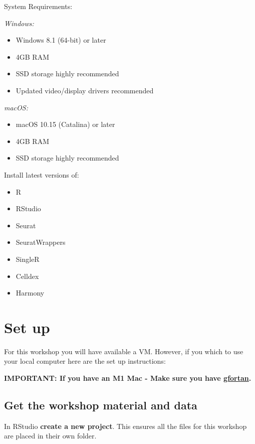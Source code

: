 \documentclass[
]{book}
\providecommand{\tightlist}{%
  \setlength{\itemsep}{0pt}\setlength{\parskip}{0pt}}
\begin{document}
System Requirements:

\emph{Windows:}

\begin{itemize}
\tightlist
\item
  Windows 8.1 (64-bit) or later
\item
  4GB RAM
\item
  SSD storage highly recommended
\item
  Updated video/display drivers recommended
\end{itemize}

\emph{macOS:}

\begin{itemize}
\tightlist
\item
  macOS 10.15 (Catalina) or later
\item
  4GB RAM
\item
  SSD storage highly recommended
\end{itemize}

Install latest versions of:

\begin{itemize}
\tightlist
\item
  R
\item
  RStudio
\item
  Seurat
\item
  SeuratWrappers
\item
  SingleR
\item
  Celldex
\item
  Harmony
\end{itemize}

\chapter{Set up}\label{set-up}

For this workshop you will have available a VM. However, if you which to use your local computer here are the set up instructions:

\textbf{IMPORTANT: If you have an M1 Mac - Make sure you have \href{https://mac.r-project.org/tools/}{gfortan}.}

\section{Get the workshop material and data}\label{get-the-workshop-material-and-data}

In RStudio \textbf{create a new project}. This ensures all the files for this workshop are placed in their own folder.
\end{document}
